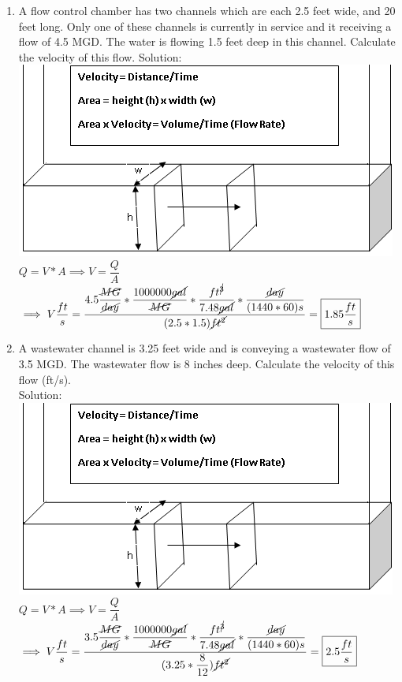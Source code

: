\documentclass{article}
\begin{document}
\begin{enumerate}
\item A flow control chamber has two channels which are each 2.5 feet wide, and 20 feet long. Only one of these channels is currently in service and it receiving a flow of 4.5 MGD. The water is flowing 1.5 feet deep in this channel. Calculate the velocity of this flow. 
Solution:\\
\includegraphics[scale=0.5]{ChannelFlow3}\\
$Q=V*A \implies V=\dfrac{Q}{A}$\\
$\implies V\dfrac{ft}{s}=\dfrac{4.5\dfrac{\cancel{MG}}{\cancel{day}}*\dfrac{1000000\cancel{gal}}{\cancel{MG}}*\dfrac{ft^{\cancel{3}}}{7.48\cancel{gal}}*\dfrac{\cancel{day}}{(1440*60)s}}{(2.5*1.5)\cancel{ft^2}}=\boxed{1.85\dfrac{ft}{s}}$\\

\item A wastewater channel is 3.25 feet wide and is conveying a wastewater flow of 3.5 MGD. The wastewater flow is 8 inches deep. Calculate the velocity of this flow (ft/s).\\
Solution:\\
\includegraphics[scale=0.5]{ChannelFlow3}\\
$Q=V*A \implies V=\dfrac{Q}{A}$\\
$\implies V\dfrac{ft}{s}=\dfrac{3.5\dfrac{\cancel{MG}}{\cancel{day}}*\dfrac{1000000\cancel{gal}}{\cancel{MG}}*\dfrac{ft^{\cancel{3}}}{7.48\cancel{gal}}*\dfrac{\cancel{day}}{(1440*60)s}}{(3.25*\dfrac{8}{12})\cancel{ft^2}}=\boxed{2.5\dfrac{ft}{s}}$\\


\end{enumerate}
\end{document}
